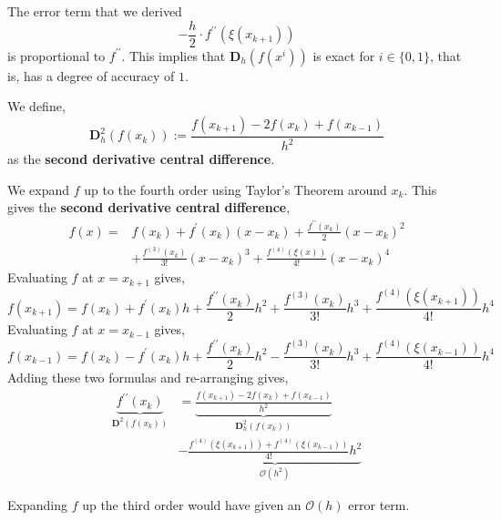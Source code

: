 \NewLine

\noindent The error term that we derived
\[-\frac{h}{2} \cdot f^{\prime \prime}\left(\xi\left(x_{k+1}\right)\right)\]
is proportional to $f^{\prime\prime}$. This implies that $\mathbf{D}_h(f(x^i))$ is exact for $i \in \{0, 1\}$, that is, has a degree of accuracy of $1$.

\NewLine

\begin{defn}
    We define,
    \[\mathbf{D}^2_h (f(x_k)) := \frac{f\left(x_{k+1}\right)-2 f\left(x_k\right)+f\left(x_{k-1}\right)}{h^2}\]
    as the \textbf{second derivative central difference}.
\end{defn}

\NewLine

\noindent We expand $f$ up to the fourth order using Taylor's Theorem around $x_k$. This gives the \textbf{second derivative central difference},
\begin{align*}
f(x)=& f\left(x_k\right)+f^{\prime}\left(x_k\right)\left(x-x_k\right)+\frac{f^{\prime \prime}\left(x_k\right)}{2}\left(x-x_k\right)^2 \\
&+\frac{f^{(3)}\left(x_k\right)}{3 !}\left(x-x_k\right)^3+\frac{f^{(4)}(\xi(x))}{4 !}\left(x-x_k\right)^4
\end{align*}
Evaluating $f$ at $x = x_{k+1}$ gives,
\[f\left(x_{k+1}\right)=f\left(x_k\right)+f^{\prime}\left(x_k\right) h+\frac{f^{\prime \prime}\left(x_k\right)}{2} h^2+\frac{f^{(3)}\left(x_k\right)}{3 !} h^3+\frac{f^{(4)}\left(\xi\left(x_{k+1}\right)\right)}{4 !} h^4\]
Evaluating $f$ at $x = x_{k-1}$ gives,
\[f\left(x_{k-1}\right)=f\left(x_k\right)-f^{\prime}\left(x_k\right) h+\frac{f^{\prime \prime}\left(x_k\right)}{2} h^2-\frac{f^{(3)}\left(x_k\right)}{3 !} h^3+\frac{f^{(4)}\left(\xi\left(x_{k-1}\right)\right)}{4 !} h^4\]
Adding these two formulas and re-arranging gives,
\begin{align*}
    \underbrace{f^{\prime \prime}\left(x_k\right)}_{\mathbf{D}^2 (f\left(x_k\right))}
    &=\underbrace{\frac{f\left(x_{k+1}\right)-2 f\left(x_k\right)+f\left(x_{k-1}\right)}{h^2}}_{\mathbf{D}_h^2 (f\left(x_k\right))} \\
    &-\underbrace{\frac{f^{(4)}\left(\xi\left(x_{k+1}\right)\right)+f^{(4)}\left(\xi\left(x_{k-1}\right)\right)}{4 !} h^2}_{\mathcal{O}\left(h^2\right)}
\end{align*}

\begin{marginfigure}
    Expanding $f$ up the third order would have given an $\mathcal{O}\left(h\right)$ error term.
\end{marginfigure}

